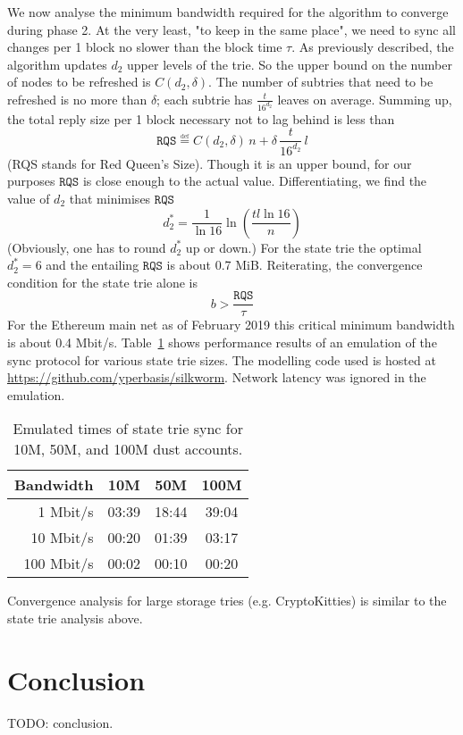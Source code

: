 \documentclass{amsart}
\begin{document}
We now analyse the minimum bandwidth required for the algorithm to converge during phase 2.
At the very least, "to keep in the same place",
we need to sync all changes per 1 block no slower than the block time $\tau$.
As previously described, the algorithm updates $d_2$ upper levels of the trie.
So the upper bound on the number of nodes to be refreshed is $C(d_2, \delta)$.
The number of subtries that need to be refreshed is no more than $\delta$;
each subtrie has $\frac{t}{16^{d_2}}$ leaves on average.
Summing up, the total reply size per 1 block necessary not to lag behind is less than
\begin{equation}
    \texttt{RQS} \overset{\underset{\mathrm{def}}{}}{=}
    C(d_2, \delta) \, n + \delta \, \frac{t}{16^{d_2}} \, l
\end{equation}
(RQS stands for Red Queen's Size).
Though it is an upper bound, for our purposes $\texttt{RQS}$ is close enough to the actual value.
Differentiating, we find the value of $d_2$ that minimises $\texttt{RQS}$
\begin{equation}
    d_2^* = \frac{1}{\ln 16} \ln \left( \frac{tl \ln16}{n} \right)
\end{equation}
(Obviously, one has to round $d_2^*$ up or down.)
For the state trie the optimal $d_2^* = 6$ and the entailing $\texttt{RQS}$ is about 0.7 MiB.
Reiterating, the convergence condition for the state trie alone is
\begin{equation}
    b > \frac{\texttt{RQS}}{\tau}
\end{equation}
For the Ethereum main net as of February 2019 this critical minimum bandwidth is about 0.4 Mbit/s.
Table~\ref{tab:emulated_time} shows performance results of an emulation of the sync protocol for various state trie sizes.
The modelling code used is hosted at
\href{https://github.com/yperbasis/silkworm/blob/master/lab/sync_emulator.cpp}{https://github.com/yperbasis/silkworm}.
Network latency was ignored in the emulation.

\begin{table}[h]
\begin{tabular}{ r | c c c }
    Bandwidth & 10M & 50M & 100M \\
    \hline
      1 Mbit/s & 03:39 & 18:44 & 39:04 \\
     10 Mbit/s & 00:20 & 01:39 & 03:17 \\
    100 Mbit/s & 00:02 & 00:10 & 00:20 \\
\end{tabular}
\caption{Emulated times of state trie sync for 10M, 50M, and 100M dust accounts.}
\label{tab:emulated_time}
\end{table}

Convergence analysis for large storage tries (e.g. CryptoKitties) is similar to the state trie analysis above.

\section{Conclusion}

TODO: conclusion.




\end{document}
